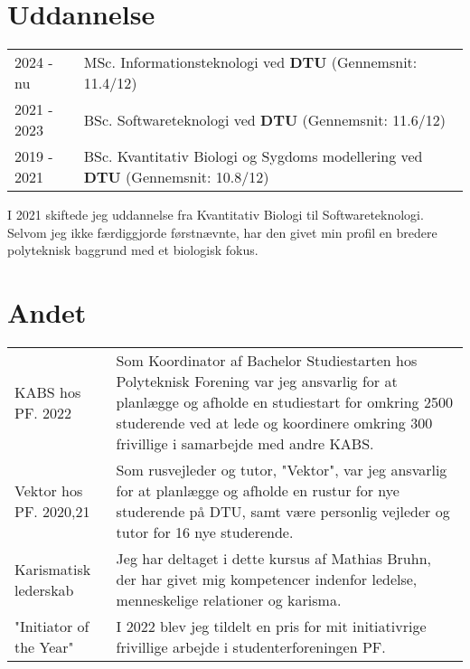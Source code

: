 \documentclass[a4paper,12pt]{article}
\begin{document}
\section{Uddannelse}
\begin{tabularx}{\linewidth}{@{}l X@{}}	
2024 - nu & MSc. Informationsteknologi ved \textbf{DTU} \hfill \normalsize (Gennemsnit: 11.4/12) \\

2021 - 2023 & BSc. Softwareteknologi ved \textbf{DTU} \hfill (Gennemsnit: 11.6/12) \\ 

2019 - 2021 & BSc. Kvantitativ Biologi og Sygdoms modellering ved \textbf{DTU} \hfill  (Gennemsnit: 10.8/12) \\
\end{tabularx}\vspace{5pt}
I 2021 skiftede jeg uddannelse fra Kvantitativ Biologi til Softwareteknologi. Selvom jeg ikke færdiggjorde førstnævnte, har den givet min profil en bredere polyteknisk baggrund med et biologisk fokus. 


\section{Andet}
\begin{tabularx}{\linewidth}{@{}l X@{}}
KABS hos PF. 2022 & \normalsize{Som Koordinator af Bachelor Studiestarten hos Polyteknisk Forening var jeg ansvarlig for at planlægge og afholde en studiestart for omkring 2500 studerende ved at lede og koordinere omkring 300 frivillige i samarbejde med andre KABS.}\\
Vektor hos PF. 2020,21  &  \normalsize{Som rusvejleder og tutor, "Vektor", var jeg ansvarlig for at planlægge og afholde en rustur for nye studerende på DTU, samt være personlig vejleder og tutor for 16 nye studerende. }\\  
Karismatisk lederskab & \normalsize{Jeg har deltaget i dette kursus af Mathias Bruhn, der har givet mig kompetencer indenfor ledelse, menneskelige relationer og karisma.}\\
"Initiator of the Year" & \normalsize{I 2022 blev jeg tildelt en pris for mit initiativrige frivillige arbejde i studenterforeningen PF. }
\end{tabularx}

\vfill
{}
\end{document}
